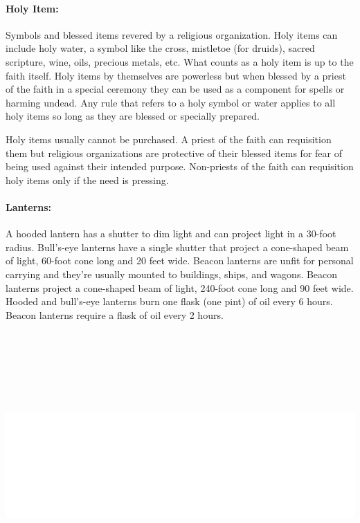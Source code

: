 \begin{multicols}{2}
\paragraph{Holy Item:} Symbols and blessed items revered by a religious organization.  Holy items can include holy water, a symbol like the cross, mistletoe (for druids), sacred scripture, wine, oils, precious metals, etc.  What counts as a holy item is up to the faith itself.  Holy items by themselves are powerless but when blessed by a priest of the faith in a special ceremony they can be used as a component for spells or harming undead.  Any rule that refers to a holy symbol or water applies to all holy items so long as they are blessed or specially prepared.

Holy items usually cannot be purchased.  A priest of the faith can requisition them but religious organizations are protective of their blessed items for fear of being used against their intended purpose.  Non-priests of the faith can requisition holy items only if the need is pressing.

\paragraph{Lanterns:} A hooded lantern has a shutter to dim light and can project light in a 30-foot radius.  Bull's-eye lanterns have a single shutter that project a cone-shaped beam of light, 60-foot cone long and 20 feet wide.  Beacon lanterns are unfit for personal carrying and they're usually mounted to buildings, ships, and wagons.  Beacon lanterns project a cone-shaped beam of light, 240-foot cone long and 90 feet wide.  Hooded and bull's-eye lanterns burn one flask (one pint) of oil every 6 hours.  Beacon lanterns require a flask of oil every 2 hours.

\noindent\includegraphics[width=\columnwidth, height=4in]{testblock.pdf} 


\end{multicols}
